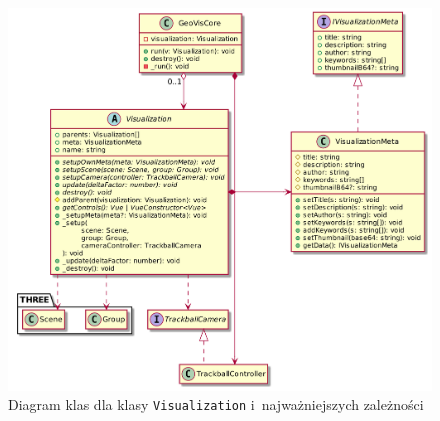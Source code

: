 \begin{figure}
    \centering
    \includegraphics[scale=0.3]{diagrams/out/c3_vis.png}
    \caption{Diagram klas dla klasy \texttt{Visualization} i~najważniejszych zależności}
    \label{fig:c3_vis}
\end{figure}

